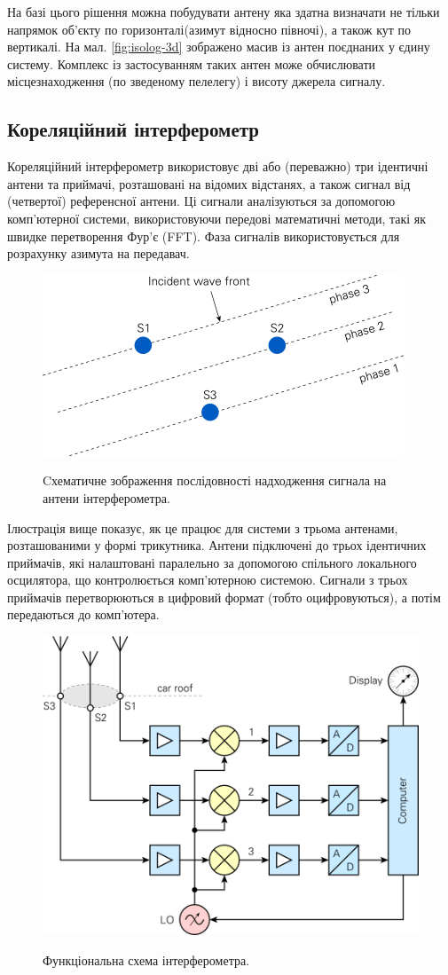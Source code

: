 \documentclass{article}
\begin{document}
На базі цього рішення можна побудувати антену яка здатна визначати не тільки напрямок об'єкту по горизонталі(азимут відносно півночі), а також кут по вертикалі. На мал. \ref{fig:isolog-3d} зображено масив із антен поєднаних у єдину систему. Комплекс із застосуванням таких антен може обчислювати місцезнаходження (по зведеному пелелегу) і висоту джерела сигналу. 

\subsection{Кореляційний інтерферометр}
Кореляційний інтерферометр використовує дві або (переважно) три ідентичні антени та приймачі, розташовані на відомих відстанях, а також сигнал від (четвертої) референсної антени. Ці сигнали аналізуються за допомогою комп'ютерної системи, використовуючи передові математичні методи, такі як швидке перетворення Фур'є (FFT). Фаза сигналів використовується для розрахунку азимута на передавач.

\begin{figure}[H]
\centering
{\includegraphics[width=0.5\linewidth]{images/df_int_wave.png}}
\caption{Cхематичне зображення послідовності надходження сигнала на антени інтерферометра.}
\end{figure}

Ілюстрація вище показує, як це працює для системи з трьома антенами, розташованими у формі трикутника. Антени підключені до трьох ідентичних приймачів, які налаштовані паралельно за допомогою спільного локального осцилятора, що контролюється комп'ютерною системою. Сигнали з трьох приймачів перетворюються в цифровий формат (тобто оцифровуються), а потім передаються до комп'ютера.

\begin{figure}[H]
\centering
{\includegraphics[width=0.6\linewidth]{images/df_int.png}}
\caption{Функціональна схема інтерферометра.}
\end{figure}
 
\end{document}
